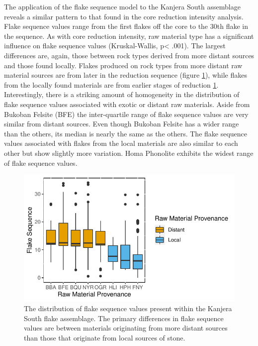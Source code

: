 \documentclass[]{elsarticle} %
\makeatletter
\def\maxwidth{\ifdim\Gin@nat@width>\linewidth\linewidth
\else\Gin@nat@width\fi}
\let\Oldincludegraphics\includegraphics
\renewcommand{\includegraphics}[1]{\Oldincludegraphics[width=\maxwidth]{#1}}
\makeatother
\begin{document}
The application of the flake sequence model to the Kanjera South
assemblage reveals a similar pattern to that found in the core reduction
intensity analysis. Flake sequence values range from the first flakes
off the core to the 30th flake in the sequence. As with core reduction
intensity, raw material type has a significant influence on flake
sequence values (Kruskal-Wallis, p\textless{} .001). The largest
differences are, again, those between rock types derived from more
distant sources and those found locally. Flakes produced on rock types
from more distant raw material sources are from later in the reduction
sequence (figure \ref{flake_seq_rm}), while flakes from the locally
found materials are from earlier stages of reduction \ref{flake_seq_rm}.
Interestingly, there is a striking amount of homogeneity in the
distribution of flake sequence values associated with exotic or distant
raw materials. Aside from Bukoban Felsite (BFE) the inter-quartile range
of flake sequence values are very similar from distant sources. Even
though Bukoban Felsite has a wider range than the others, its median is
nearly the same as the others. The flake sequence values associated with
flakes from the local materials are also similar to each other but show
slightly more variation. Homa Phonolite exhibits the widest range of
flake sequence values.

\begin{figure}
\centering
\includegraphics{Reeves_Braun_et_al_2020_Kanjera_South_JHE_files/figure-latex/unnamed-chunk-5-1.pdf}
\caption{The distribution of flake sequence values present within the
Kanjera South flake assemblage. The primary differences in flake
sequence values are between materials originating from more distant
sources than those that originate from local sources of stone.
\label{flake_seq_rm}}
\end{figure}
\end{document}
